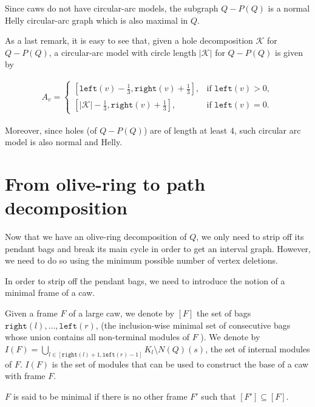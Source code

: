 \documentclass{article}
\begin{document}
    \begin{cor}
        Since caws do not have circular-arc models,
        the subgraph $Q - P\left(Q\right)$ is
        a normal Helly circular-arc graph
        which is also maximal in $Q$.
    \end{cor}
    
    As a last remark,
    it is easy to see that,
    given a hole decomposition $\mathcal{K}$ 
    for $Q - P\left(Q\right)$, a circular-arc model
    with circle length $\left|\mathcal{K}\right|$ 
    for $Q - P\left(Q\right)$ is given by
    
    \begin{gather*}
    A_{v} =
    \begin{cases}
    \left[\texttt{left}\left(v\right) - \frac{1}{3}, 
    \texttt{right}\left(v\right) + \frac{1}{3}\right], & \text{if } \texttt{left}\left(v\right) > 0, \\
    \left[\left|\mathcal{K}\right| - \frac{1}{3}, 
    \texttt{right}\left(v\right) + \frac{1}{3}\right], & \text{if } \texttt{left}\left(v\right) = 0.
    \end{cases}
    \end{gather*}
    
    Moreover, since holes (of $Q - P\left(Q\right)$) are of length
    at least $4$, such circular arc model
    is also normal and Helly.
        
    \section{From olive-ring to path decomposition}
    Now that we have an olive-ring
    decomposition of $Q$, we only need to
    strip off its pendant bags and break
    its main cycle in order to get an interval graph.
    However, we need to do so using
    the minimum possible number of vertex
    deletions. 
    
    In order to strip off the pendant
    bags, we need to introduce the notion
    of a minimal frame of a caw.

    \begin{defn}
        Given a frame $F$ of a large caw, we
        denote by $\left[F\right]$
        the set of bags $\texttt{right}\left(l\right),
        \ldots, \texttt{left}\left(r\right)$,
        (the inclusion-wise minimal
        set of consecutive bags whose union contains
        all non-terminal modules of $F$ ).
        We denote by $I\left(F\right) = \bigcup_{l \in \left[
        \texttt{right}\left(l\right) + 1, \texttt{left}\left(r\right) - 1\right]} 
        K_{l} \setminus N\left(Q\right)\left(s\right)$,
        the set of internal modules of $F$.
        $I\left(F\right)$ is the set of
        modules that can be used to construct
        the base of a caw with frame $F$.
        
        $F$ is said to be minimal
        if there is no other frame $F'$ 
        such that $\left[F'\right] \subseteq \left[F\right]$.
    \end{defn}
    
\end{document}
